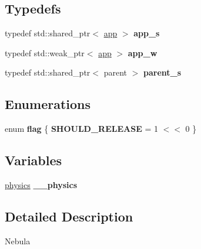 \subsection*{\-Typedefs}
\begin{DoxyCompactItemize}
\item 
\hypertarget{namespaceneb_a1b51fc9e6f1d60fbce949074630087d3}{typedef std\-::shared\-\_\-ptr$<$ \hyperlink{classneb_1_1app}{app} $>$ {\bfseries app\-\_\-s}}\label{namespaceneb_a1b51fc9e6f1d60fbce949074630087d3}

\item 
\hypertarget{namespaceneb_ad6e5405bd4d024b280ef795e08b9c950}{typedef std\-::weak\-\_\-ptr$<$ \hyperlink{classneb_1_1app}{app} $>$ {\bfseries app\-\_\-w}}\label{namespaceneb_ad6e5405bd4d024b280ef795e08b9c950}

\item 
\hypertarget{namespaceneb_aa0937cb07225b485cc19bbebf2d235ee}{typedef std\-::shared\-\_\-ptr$<$ parent $>$ {\bfseries parent\-\_\-s}}\label{namespaceneb_aa0937cb07225b485cc19bbebf2d235ee}

\end{DoxyCompactItemize}
\subsection*{\-Enumerations}
\begin{DoxyCompactItemize}
\item 
enum {\bfseries flag} \{ {\bfseries \-S\-H\-O\-U\-L\-D\-\_\-\-R\-E\-L\-E\-A\-S\-E} =  1 $<$$<$ 0
 \}
\end{DoxyCompactItemize}
\subsection*{\-Variables}
\begin{DoxyCompactItemize}
\item 
\hypertarget{namespaceneb_a8fdb4f53a66aec6d854ff9b5efd36ed3}{\hyperlink{classneb_1_1physics}{physics} {\bfseries \-\_\-\-\_\-physics}}\label{namespaceneb_a8fdb4f53a66aec6d854ff9b5efd36ed3}

\end{DoxyCompactItemize}


\subsection{\-Detailed \-Description}
\-Nebula 